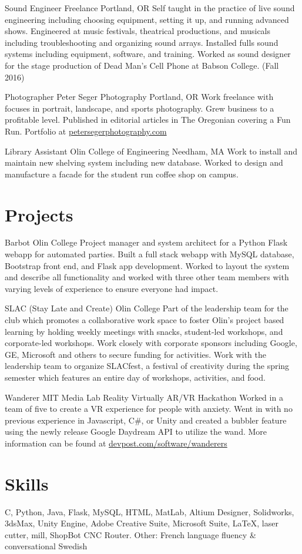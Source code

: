 \documentclass[11 pt]{moderncv}
\begin{document}
{Sound Engineer}
{Freelance}
{Portland, OR}
{}
{Self taught in the practice of live sound engineering including choosing equipment, setting it up, and running advanced shows. Engineered at music festivals, theatrical productions, and musicals including troubleshooting and organizing sound arrays. Installed fulls sound systems including equipment, software, and training. Worked as sound designer for the stage production of Dead Man's Cell Phone at Babson College. (Fall 2016)}

{Photographer}
{Peter Seger Photography}
{Portland, OR}
{}
{Work freelance with focuses in portrait, landscape, and sports photography. Grew business to a profitable level.
 Published in editorial articles in The Oregonian covering a Fun Run. Portfolio at \href{www.petersegerphotography.com}{petersegerphotography.com}}

{Library Assistant}
{Olin College of Engineering}
{Needham, MA}
{}
{Work to install and maintain new shelving system including new database. Worked to design and manufacture a facade for the student run coffee shop on campus.}

\vspace{0.03 in}
\section{Projects}

{Barbot}
{Olin College}
{}
{}
{Project manager and system architect for a Python Flask webapp for automated parties. Built a full stack webapp with MySQL database, Bootstrap front end, and Flask app development. Worked to layout the system and describe all functionality and worked with three other team members with varying levels of experience to ensure everyone had impact. }

{SLAC (Stay Late and Create)}
{Olin College}
{}
{}
{Part of the leadership team for the club which promotes a collaborative work space to foster Olin's project based learning by holding weekly meetings with snacks, student-led workshops, and corporate-led workshops. Work closely with corporate sponsors including Google, GE, Microsoft and others to secure funding for activities. Work with the leadership team to organize SLACfest, a festival of creativity during the spring semester which features an entire day of workshops, activities, and food.}


{Wanderer}
{MIT Media Lab Reality Virtually AR/VR Hackathon}
{}
{}
{Worked in a team of five to create a VR experience for people with anxiety. Went in with no previous experience in Javascript, C\#, or Unity and created a bubbler feature using the newly release Google Daydream API to utilize the wand. More information can be found at \href{https://devpost.com/software/wanderers}{devpost.com/software/wanderers}}

\section{Skills}

\cvline{}
{
C,
Python,
Java,
Flask,
MySQL,
HTML,
MatLab,
Altium Designer,
Solidworks,
3dsMax,
Unity Engine,
Adobe Creative Suite,
Microsoft Suite,
\LaTeX{},
laser cutter,
mill,
ShopBot CNC Router.
}
\cvline{}
{Other: French language fluency \& conversational Swedish}
\end{document}

